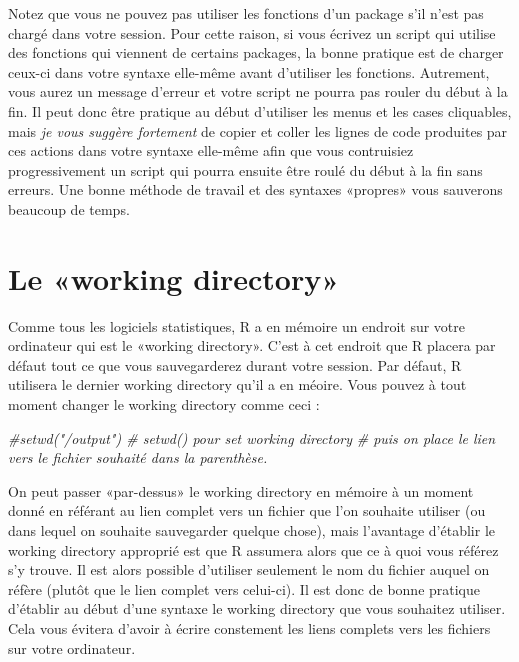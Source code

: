 \documentclass[
]{book}
\newenvironment{Shaded}{\begin{snugshade}}{\end{snugshade}}
\newcommand{\CommentTok}[1]{\textcolor[rgb]{0.56,0.35,0.01}{\textit{#1}}}
\begin{document}
Notez que vous ne pouvez pas utiliser les fonctions d'un package s'il n'est pas chargé dans votre session. Pour cette raison, si vous écrivez un script qui utilise des fonctions qui viennent de certains packages, la bonne pratique est de charger ceux-ci dans votre syntaxe elle-même avant d'utiliser les fonctions. Autrement, vous aurez un message d'erreur et votre script ne pourra pas rouler du début à la fin. Il peut donc être pratique au début d'utiliser les menus et les cases cliquables, mais \emph{je vous suggère fortement} de copier et coller les lignes de code produites par ces actions dans votre syntaxe elle-même afin que vous contruisiez progressivement un script qui pourra ensuite être roulé du début à la fin sans erreurs. Une bonne méthode de travail et des syntaxes «propres» vous sauverons beaucoup de temps.

\hypertarget{le-working-directory}{%
\section{Le «working directory»}\label{le-working-directory}}

Comme tous les logiciels statistiques, R a en mémoire un endroit sur votre ordinateur qui est le «working directory». C'est à cet endroit que R placera par défaut tout ce que vous sauvegarderez durant votre session. Par défaut, R utilisera le dernier working directory qu'il a en méoire. Vous pouvez à tout moment changer le working directory comme ceci :

\begin{Shaded}
\begin{Highlighting}[]
\CommentTok{\#setwd("/output") \# setwd() pour set working directory}
\CommentTok{\# puis on place le lien vers le fichier souhaité dans la parenthèse. }
\end{Highlighting}
\end{Shaded}

On peut passer «par-dessus» le working directory en mémoire à un moment donné en référant au lien complet vers un fichier que l'on souhaite utiliser (ou dans lequel on souhaite sauvegarder quelque chose), mais l'avantage d'établir le working directory approprié est que R assumera alors que ce à quoi vous référez s'y trouve. Il est alors possible d'utiliser seulement le nom du fichier auquel on réfère (plutôt que le lien complet vers celui-ci). Il est donc de bonne pratique d'établir au début d'une syntaxe le working directory que vous souhaitez utiliser. Cela vous évitera d'avoir à écrire constement les liens complets vers les fichiers sur votre ordinateur.
\end{document}
